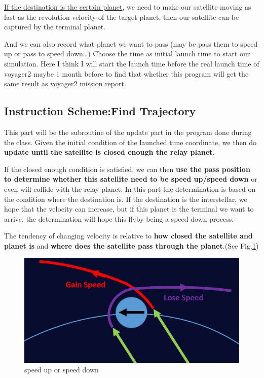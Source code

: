 \documentclass{article}
\begin{document}
\begin{multicols}{2}
\underline{If the destination is the certain planet}, we need to make our satellite moving as fast as the revolution velocity of the target planet, then our satellite can be captured by the terminal planet.

And we can also record what planet we want to pass (may be pass them to speed up or pass to speed down…)
Choose the time as initial launch time to start our simulation.
Here I think I will start the launch time before the real launch time of voyager2 maybe 1 month before to find that whether this program will get the same result as voyager2 mission report.


\subsection{Instruction Scheme:Find Trajectory}
This part will be the subroutine of the update part in the program done during the class.
Given the initial condition of the launched time coordinate, we then do \textbf{update until the satellite is closed enough the relay planet}.

If the closed enough condition is satisfied, we can then \textbf{use the pass position to determine whether this satellite need to be speed up/speed down} or even will collide with the relay planet. In this part the determination is based on the condition where the destination is. If the destination is the interstellar, we hope that the velocity can increase, but if this planet is the terminal we want to arrive, the determination will hope this flyby being a speed down process.

The tendency of changing velocity is relative to \textbf{how closed the satellite and planet is} and \textbf{where does the satellite pass through the planet}.(See Fig.\ref{fig:speedupdown})

\begin{figure}[H]
    \centering 
	\includegraphics[scale=0.45]{speed_updown.jpg}
	\caption{speed up or speed down} %
	\label{fig:speedupdown} %
\end{figure}


\end{multicols}
\end{document}
